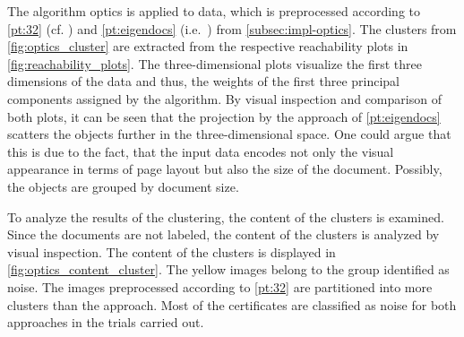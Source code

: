 The algorithm \ac{optics} is applied to data, which is preprocessed according to \autoref{pt:32} (cf. \cite{OPTICS1999}) 
and \autoref{pt:eigendocs} (i.e.\ \eigendocs{}) from \autoref{subsec:impl-optics}.
The clusters from \autoref{fig:optics_cluster} are extracted from the respective reachability plots in \autoref{fig:reachability_plots}.
The three-dimensional plots visualize the first three dimensions of the data and thus, 
the weights of the first three principal components assigned by the \eigendocs{} algorithm.
By visual inspection and comparison of both plots, 
it can be seen that the projection by the \eigendocs{} approach of \autoref{pt:eigendocs} scatters the objects further in the three-dimensional space.
One could argue that this is due to the fact, 
that the input data encodes not only the visual appearance in terms of page layout but also the size of the document.
Possibly, the objects are grouped by document size.


To analyze the results of the clustering, the content of the clusters is examined.
Since the documents are not labeled, the content of the clusters is analyzed by visual inspection.
The content of the clusters is displayed in \autoref{fig:optics_content_cluster}.
The yellow images belong to the group identified as noise.
The images preprocessed according to \autoref{pt:32} are partitioned into more clusters than the \eigendocs{} approach.
Most of the certificates are classified as noise for both approaches in the trials carried out.

